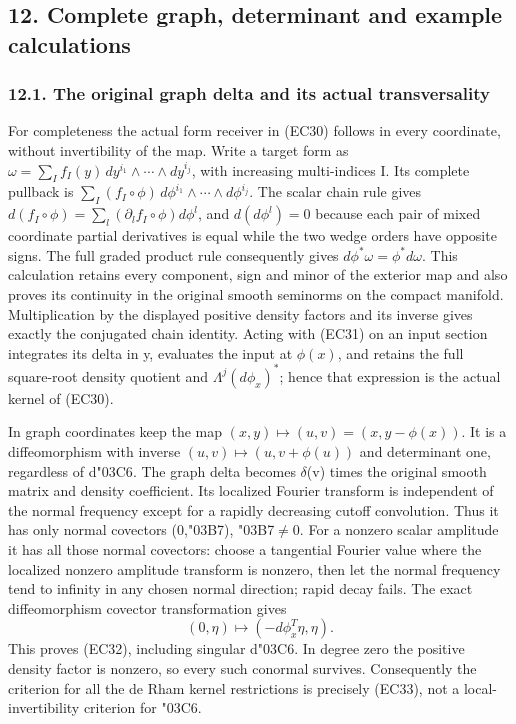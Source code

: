 \documentclass[
  11pt,
]{article}
\begin{document}
\subsection{12. Complete graph, determinant and example
calculations}\label{complete-graph-determinant-and-example-calculations}

\subsubsection{12.1. The original graph delta and its actual
transversality}\label{the-original-graph-delta-and-its-actual-transversality}

For completeness the actual form receiver in (EC30) follows in every
coordinate, without invertibility of the map. Write a target form as
\(\omega=\sum_I f_I(y)\,dy^{i_1}\wedge\cdots\wedge dy^{i_j}\), with
increasing multi-indices I. Its complete pullback is
\(\sum_I(f_I\circ\phi)\,d\phi^{i_1}\wedge\cdots\wedge d\phi^{i_j}\). The
scalar chain rule gives
\(d(f_I\circ\phi)=\sum_l(\partial_l f_I\circ\phi)d\phi^l\), and
\(d(d\phi^l)=0\) because each pair of mixed coordinate partial
derivatives is equal while the two wedge orders have opposite signs. The
full graded product rule consequently gives
\(d\phi^*\omega=\phi^*d\omega\). This calculation retains every
component, sign and minor of the exterior map and also proves its
continuity in the original smooth seminorms on the compact manifold.
Multiplication by the displayed positive density factors and its inverse
gives exactly the conjugated chain identity. Acting with (EC31) on an
input section integrates its delta in y, evaluates the input at
\(\phi(x)\), and retains the full square-root density quotient and
\(\Lambda^j(d\phi_x)^*\); hence that expression is the actual kernel of
(EC30).

In graph coordinates keep the map \((x,y)\mapsto(u,v)=(x,y-\phi(x))\).
It is a diffeomorphism with inverse \((u,v)\mapsto(u,v+\phi(u))\) and
determinant one, regardless of d{\ReaderSymbols\char"03C6}. The graph delta becomes \ensuremath{\delta}(v) times
the original smooth matrix and density coefficient. Its localized
Fourier transform is independent of the normal frequency except for a
rapidly decreasing cutoff convolution. Thus it has only normal covectors
(0,{\ReaderSymbols\char"03B7}), {\ReaderSymbols\char"03B7}\ensuremath{\ne}0. For a nonzero scalar amplitude it has all those normal
covectors: choose a tangential Fourier value where the localized nonzero
amplitude transform is nonzero, then let the normal frequency tend to
infinity in any chosen normal direction; rapid decay fails. The exact
diffeomorphism covector transformation gives \[
(0,\eta)\longmapsto(-d\phi_x^T\eta,\eta).
\tag{LC10}
\] This proves (EC32), including singular d{\ReaderSymbols\char"03C6}. In degree zero the
positive density factor is nonzero, so every such conormal survives.
Consequently the criterion for all the de Rham kernel restrictions is
precisely (EC33), not a local-invertibility criterion for {\ReaderSymbols\char"03C6}.
\end{document}
